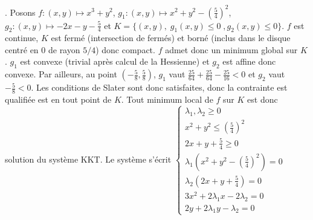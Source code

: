 \documentclass{report}
\begin{document}
\newline
{}. Posons $f:(x,y)\mapsto x^3+y^2$, $g_1:(x,y)\mapsto x^2+y^2-\left(\frac{5}{4}\right)^2$, $g_2:(x,y)\mapsto -2x-y-\frac 54$ et $K=\{(x,y),\; g_1(x,y)\leq 0\;, g_2(x,y)\leq 0\}$. \newline
\newline 
$f$ est continue, $K$ est fermé (intersection de fermés) et borné (inclus dans le disque centré en $0$ de rayon $5/4$) donc compact. $f$ admet donc un minimum global sur $K$.\newline
\newline 
$g_1$ est convexe (trivial après calcul de la Hessienne) et $g_2$ est affine donc convexe. Par ailleurs, au point $(-\frac 58,\frac 58)$, $g_1$ vaut $\frac{25}{64} +\frac{25}{64} -\frac{25}{16}<0$ et $g_2$ vaut $-\frac 58<0$. Les conditions de Slater sont donc satisfaites, donc la contrainte est qualifiée est en tout point de $K$. Tout minimum local de $f$ sur $K$ est donc solution du système KKT.\newline
Le système s'écrit $\begin{cases}
\lambda_1, \lambda_2 \geq 0 \\
x^2+y^2\leq \left(\frac{5}{4}\right)^2 \\
2x+y+\frac{5}{4}\geq 0 \\
\lambda_1(x^2+y^2- \left(\frac{5}{4}\right)^2) = 0 \\
\lambda_2(2x+y+\frac{5}{4}) = 0 \\
3x^2 + 2\lambda_1 x- 2\lambda_2 = 0 \\
2y + 2\lambda_1 y - \lambda_2 = 0
\end{cases}$ \newline
\end{document}
